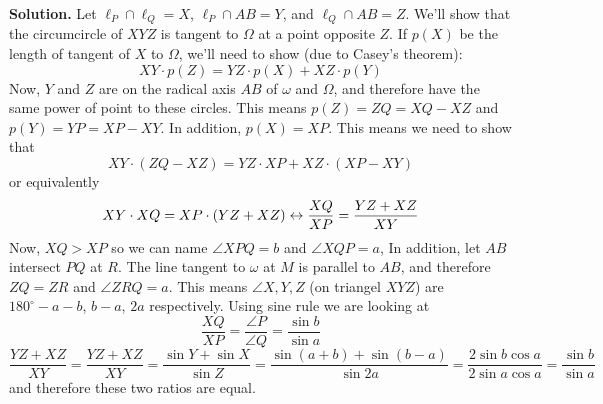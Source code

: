 \documentclass[11pt,a4paper]{article}
\begin{document}
\begin{enumerate}
	\textbf{Solution.} Let $\ell_P\cap \ell_Q=X$, $\ell_P\cap AB=Y$, and $\ell_Q\cap AB=Z$. We'll show that the circumcircle of $XYZ$ is tangent to $\Omega$ at a point opposite $Z$. If $p(X)$ be the length of tangent of $X$ to $\Omega$, we'll need to show (due to Casey's theorem): 
	\[
	XY\cdot p(Z)=YZ\cdot p(X)+XZ \cdot p(Y)
	\]
	Now, $Y$ and $Z$ are on the radical axis $AB$ of $\omega$ and $\Omega$, and therefore have the same power of point to these circles. This means $p(Z)=ZQ=XQ-XZ$ and $p(Y)=YP=XP-XY$. In addition, $p(X)=XP$. This means we need to show that 
	\[
	XY\cdot (ZQ-XZ)=YZ\cdot XP+XZ \cdot (XP-XY)
	\]
	or equivalently
	\[
	XY\cdot XQ = XP\cdot (YZ+XZ)\leftrightarrow \frac{XQ}{XP}=\frac{YZ+XZ}{XY}
	\]
	Now, $XQ>XP$ so we can name $\angle XPQ=b$ and $\angle XQP=a$, In addition, let $AB$ intersect $PQ$ at $R$. The line tangent to $\omega$ at $M$ is parallel to $AB$, and therefore $ZQ=ZR$ and $\angle ZRQ=a$. This means $\angle X, Y, Z$ (on triangel $XYZ$) are $180^{\circ}-a-b$, $b-a$, $2a$ respectively. Using sine rule we are looking at 
	\[
	\frac{XQ}{XP}=\frac{\angle P}{\angle Q}=\frac{\sin b}{\sin a}\]
	\[
	\frac{YZ+XZ}{XY} = \frac{YZ+XZ}{XY} = \frac{\sin Y+\sin X}{\sin Z} = \frac{\sin (a+b)+\sin (b-a)}{\sin 2a} = \frac{2\sin b\cos a}{2\sin a\cos a} = \frac{\sin b}{\sin a}
	\]
	and therefore these two ratios are equal. 
	
\end{enumerate}
\end{document}
